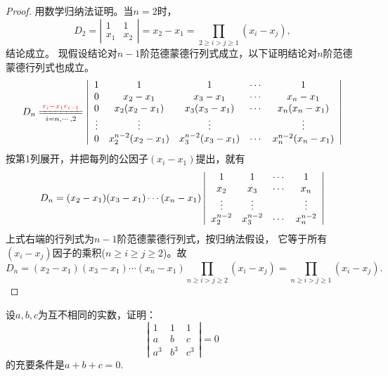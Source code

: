 \begin{frame}
\begin{proof}
  用数学归纳法证明。当$n=2$时，
  $$
  D_2 = \left|
    \begin{array}{cc}
      1 & 1 \\
      x_1 & x_2
    \end{array}
  \right|
  = x_2 - x_1 = \prod_{2 \ge i > j \ge 1} (x_i - x_j),
  $$
  结论成立。 \pause
  现假设结论对$n-1$阶范德蒙德行列式成立，以下证明结论对$n$阶范德蒙德行列式也成立。 
  $$
  D_n \xlongequal[i=n,\cdots, 2]{\red{r_i - x_1 r_{i-1}}}\left|
    \begin{array}{ccccc}  
      1     & 1                    & 1                       & \cd   & 1    \\
      0     & x_2 - x_1            & x_3 - x_1               &  \cd  & x_n - x_1 \\
      0     & x_2(x_2 - x_1)       & x_3(x_3 - x_1)          &  \cd  & x_n(x_n - x_1)\\
      \vd   & \vd                  & \vd                     &      & \vd   \\
      0     & x_2^{n-2}(x_2-x_1)    & x_3^{n-2}(x_3 - x_1)    &  \cd  & x_n^{n-2}(x_n - x_1) 
    \end{array}\right|
  $$  \pause
  按第1列展开，并把每列的公因子$(x_i-x_1)$提出，就有
  $$
  D_n = (x_2-x_1)(x_3-x_1)\cdots(x_n-x_1)\left|
    \begin{array}{cccc}  
      1            & 1          &  \cdots  & 1 \\
      x_2          & x_3         &  \cdots  & x_n\\
      \vdots          & \vdots         &      & \vdots   \\
      x_2^{n-2}     & x_3^{n-2}    &  \cdots  & x_n^{n-2}
    \end{array}\right|
  $$ \pause
  上式右端的行列式为$n-1$阶范德蒙德行列式，按归纳法假设，
  它等于所有$(x_i-x_j)$因子的乘积($n\ge i \ge j \ge 2$)。故
  $$
  D_n = (x_2-x_1)(x_3-x_1)\cdots(x_n-x_1) \prod_{n\ge i > j \ge 2}(x_i - x_j)
  = \prod_{n\ge i > j \ge 1}(x_i - x_j).
  $$
\end{proof}
%
\end{frame}

\begin{frame}
\begin{testexample}
  设$a,b,c$为互不相同的实数，证明：
  $$
  \left|
    \begin{array}{ccc}
      1   &   1   &   1\\
      a   &   b   &   c\\
      a^3 &   b^3 &   c^3
    \end{array}
  \right|=0
  $$
  的充要条件是$a+b+c=0$.
\end{testexample}
\end{frame}

